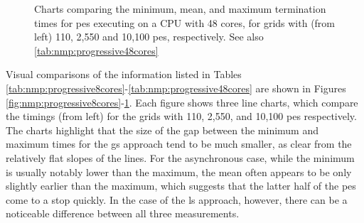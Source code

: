 \begin{figure}
    \centering
    \caption[Charts comparing the minimum, mean, and maximum termination times for \acrshort{pe}s]{Charts comparing the minimum, mean, and maximum termination times for \glspl{pe} executing on a CPU with 48 cores, for grids with (from left) 110, 2,550 and 10,100 \glspl{pe}, respectively.  See also \autoref{tab:nmp:progressive48cores}}
    \label{fig:nmp:progressivecharts48cores}
\end{figure}

Visual comparisons of the information listed in Tables \ref{tab:nmp:progressive8cores}-\ref{tab:nmp:progressive48cores} are shown in Figures \ref{fig:nmp:progressive8cores}-\ref{fig:nmp:progressivecharts48cores}.  Each figure shows three line charts, which compare the timings (from left) for the grids with 110, 2,550, and 10,100 \glspl{pe} respectively.  The charts highlight that the size of the gap between the minimum and maximum times for the \gls{gs} approach tend to be much smaller, as clear from the relatively flat slopes of the lines.  For the asynchronous case, while the minimum is usually notably lower than the maximum, the mean often appears to be only slightly earlier than the maximum, which suggests that the latter half of the \glspl{pe} come to a stop quickly.  In the case of the \gls{ls} approach, however, there can be a noticeable difference between all three measurements.

